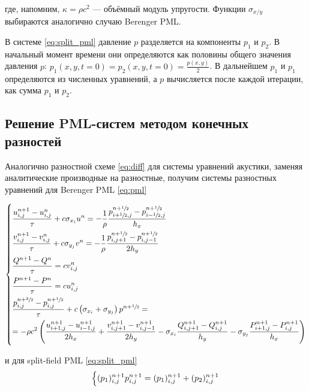 где, напомним,  $\kappa = \rho c^2$ --- объёмный модуль упругости. Функции $\sigma_{x/y}$ выбираются аналогично случаю Berenger PML.

В системе \eqref{eq:split_pml} давление $p$ разделяется на  компоненты $p_1$ и $p_2$. В начальный момент времени они определяются как половины общего значения давления $p$: $p_1(x,y,t=0) = p_2(x,y,t=0) = \frac{p(x,y)}{2}$. В дальнейшем $p_1$ и $p_1$ определяются из численных уравнений, а $p$ вычисляется после каждой итерации, как сумма $p_1$ и $p_2$. 
    
\subsection{Решение PML-систем методом конечных разностей}
    
Аналогично разностной схеме \eqref{eq:diff} для системы уравнений  акустики, заменяя аналитические производные на разностные, получим системы разностных уравнений для Berenger PML \eqref{eq:pml}
    
\begin{equation}
	\begin{dcases}
		\frac{u^{n+1}_{i,j} - u^{n}_{i,j}}{\tau} + c \sigma_{x_{i}} u^{n} = -\frac{1}{\rho}\frac{p^{n+\sfrac{1}{2}}_{i+\sfrac{1}{2},j} - p^{n+\sfrac{1}{2}}_{i-\sfrac{1}{2},j}}{h_x} \\
		\frac{v^{n+1}_{i,j} - v^{n}_{i,j}}{\tau} + c \sigma_{y_{j}} v^{n}  = -\frac{1}{\rho}\frac{p^{n+\sfrac{1}{2}}_{i,j+1} - p^{n+\sfrac{1}{2}}_{i,j-1}}{2h_y} \\
		\frac{Q^{n+1} - Q^{n}}{\tau} = c v^n_{i,j}\\
		\frac{P^{n+1} - P^{n}}{\tau} = c u^n_{i,j}\\
	    \dfrac{p^{n+\sfrac{3}{2}}_{i,j} - p^{n+\sfrac{1}{2}}_{i,j}}{\tau} + c \left(\sigma_{x_{i}} + \sigma_{y_{j}}\right)p^{n+\sfrac{1}{2}} =\\= -\rho c^2 \left(\frac{u^{n+1}_{i+1,j} - u^{n+1}_{i-1,j}}{2h_x} + \dfrac{v^{n+1}_{i,j+1} - v^{n+1}_{i,j-1}}{2h_y} - \sigma_{x_i}\frac{Q^{n+1}_{i,j+1} - Q^{n+1}_{i,j}}{h_y} - \sigma_{y_j}\frac{P^{n+1}_{i+1,j} - P^{n+1}_{i,j}}{h_x} \right)
	\end{dcases}\label{eq:diff_pml}
\end{equation}
    
и для split-field PML \eqref{eq:split_pml}
\begin{equation}
    \begin{dcases}
        (p_1)_{i,j}^{n+1}
        p_{i,j}^{n+1} = (p_1)_{i,j}^{n+1} + (p_2)_{i,j}^{n+1}
    \end{dcases}
    \label{eq:diff_split_pml}
\end{equation}
    
